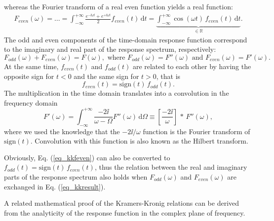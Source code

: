 whereas the Fourier transform of a real even function yields a real function:
\begin{equation} 
\begin{split} 
F_{even}(\omega)= \ldots =   \int_{-\infty}^{+\infty} \frac{e^{-\ii \omega t}+e^{+\ii \omega t}}{2} f_{even}(t) \,\mbox{d}t 
		 = \underbrace{\int_{-\infty}^{+\infty} \cos(\omega t) \, f_{even}(t) \,\mbox{d}t}_{\mbox{$\in \mathbb{R}$}}.
\end{split} 
\label{eq_kkFeven}\end{equation}
The odd and even components of the time-domain response function correspond to the imaginary and real part of the response spectrum, respectively:
\begin{equation} F_{odd}(\omega) + F_{even}(\omega) = F(\omega), \text{ where } F_{odd}(\omega) = F''(\omega) \text{ and } F_{even}(\omega) = F'(\omega).  \label{eq_kkFodd}\end{equation}
At the same time, $f_{even}(t)$ and $f_{odd}(t)$ are related to each other by having the opposite sign for $t<0$ and the same sign for $t>0$, that is 
\begin{equation} f_{even}(t) = \mbox{sign}(t)\,f_{odd}(t). \label{eq_kkfeven}\end{equation}
The multiplication in the time domain translates into a convolution in the frequency domain
\begin{equation} 
F'(\omega) = \int_{-\infty}^{+\infty}  \frac{-2\ii}{\omega - \Omega} F''(\omega) \,\mbox{d}\Omega  \equiv  \left[\frac{-2\ii}{\omega}\right]\,\ast\,F''(\omega),
\label{eq_kkresult}\end{equation} 
where we used the knowledge that the $-2\ii/\omega$ function is the Fourier transform of $\mbox{sign}(t)$. Convolution with this function is also known as the Hilbert transform. %

Obviously, Eq. (\ref{eq_kkfeven}) can also be converted to $f_{odd}(t) = \mbox{sign}(t)\,f_{even}(t)$, thus the relation between the real and imaginary parts of the response spectrum also holds when $F_{odd}(\omega)$ and $F_{even}(\omega)$ are exchanged in Eq. (\ref{eq_kkresult}). 

A related mathematical proof of the Kramers-Kronig relations can be derived from the analyticity of the response function in the complex plane of frequency. \cite[p. 125]{klingshirn2007semiconductor}


